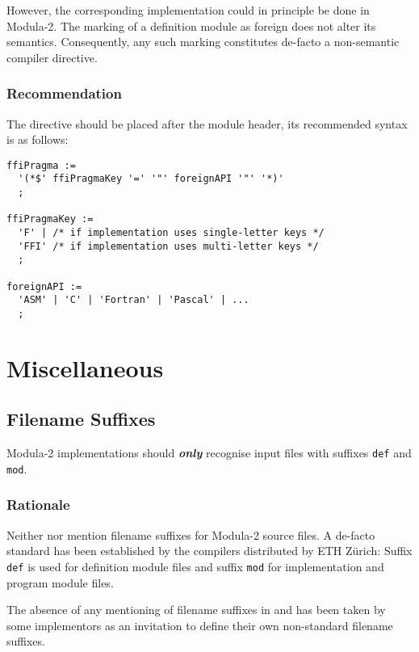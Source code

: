 \documentclass[10pt,a4paper]{article}
\renewcommand{\emph}[1]{\textbf{\textit{#1}}}
\begin{document}
However, the corresponding implementation could in principle be done in
Modula-2. The marking of a definition module as foreign does not alter its
semantics. Consequently, any such marking constitutes de-facto a
\gls{non-semantic compiler directive}.

\subsubsection{Recommendation}

The directive should be placed after the module header, its recommended syntax
is as follows:

\begin{verbatim}
ffiPragma :=
  '(*$' ffiPragmaKey '=' '"' foreignAPI '"' '*)'
  ;
  
ffiPragmaKey :=
  'F' | /* if implementation uses single-letter keys */
  'FFI' /* if implementation uses multi-letter keys */
  ; 

foreignAPI :=
  'ASM' | 'C' | 'Fortran' | 'Pascal' | ...
  ;
\end{verbatim}


\section{Miscellaneous}

\subsection{Filename Suffixes}

Modula-2 implementations should \emph{only} recognise input files with
suffixes \verb|def| and \verb|mod|.

\subsubsection{Rationale}

Neither \cite{Wirth78} nor \cite{Wirth88} mention filename suffixes for
Modula-2 source files. A de-facto standard has been established by the
compilers distributed by ETH Z\"{u}rich: Suffix \verb|def| is used for
definition module files and suffix \verb|mod| for implementation and program
module files.

The absence of any mentioning of filename suffixes in \cite{Wirth78} and
\cite{Wirth88} has been taken by some implementors as an invitation to
define their own non-standard filename suffixes.
\end{document}

